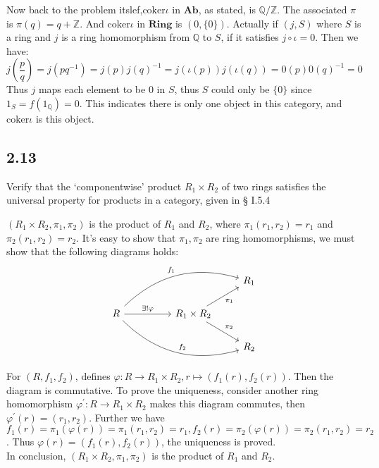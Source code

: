\documentclass[a4paper, pdf, 12pt]{article}
\makeatletter
\renewenvironment{proof}[1][\proofname]{\par
  \pushQED{\qed}%
  \normalfont \topsep6\p@\@plus6\p@\relax
  \trivlist
  \item[%
    \hskip\labelsep
    \normalfont\bfseries %
    #1%
    \@addpunct{.}%
  ]\ignorespaces
}{%
  \popQED\endtrivlist\@endpefalse
}
\let\qed\relax %
\DeclareRobustCommand{\qed}{%
  \ifmmode \mathqed
  \else
    \leavevmode\unskip\penalty\@M\hbox{}\nobreak\hspace{.5em minus .1em}%
    \hbox{\qedsymbol}%
  \fi
}
\makeatother
\begin{document}
\begin{proof}
  Now back to the problem itslef,$\mbox{coker}\iota$ in $\mathbf{Ab}$, as stated, is $\mathbb{Q}/\mathbb{Z}$. The associated $\pi$ is $\pi(q) = q+\mathbb{Z}$. 
  And $\mbox{coker}\iota$ in $\mathbf{Ring}$ is $(0, \{0\})$. Actually if $(j, S)$ where $S$ is a ring  and $j$ is a ring homomorphism from $\mathbb{Q}$ to $S$, 
  if it satisfies $j\circ \iota = 0$. Then we have:
  $$
  j(\frac{p}{q}) = j(pq^{-1}) = j(p)j(q)^{-1}=j(\iota(p))j(\iota(q))=0(p)0(q)^{-1}=0
  $$
  Thus $j$ maps each element to be 0 in $S$, thus $S$ could only be $\{0\}$ since $1_{S}=f(1_{\mathbb{Q}})=0$. This indicates there is only one object in this category,
  and $\mbox{coker}\iota$ is this object.
\end{proof}
\subsection*{2.13}
Verify that the ‘componentwise’ product $R_1\times R_2$ of two rings satisﬁes the universal property for products in a category, given in § I.5.4
\begin{proof}
  $(R_1\times R_2, \pi_1, \pi_2)$ is the product of $R_1$ and $R_2$, where $\pi_1(r_1,r_2)=r_1$ and $\pi_2(r_1, r_2)=r_2$. It's easy to show that $\pi_1, \pi_2$ are 
  ring homomorphisms, we must show that the following diagrams holds:
  $$
\begin{tikzcd}
  &  &                                                        & R_1 \\
R \arrow[rr, "\exists!\varphi"] \arrow[rrru, "f_1", bend left] \arrow[rrrd, "f_2", bend right] &  & R_1\times R_2 \arrow[ru, "\pi_1"'] \arrow[rd, "\pi_2"] &     \\
  &  &                                                        & R_2
\end{tikzcd}
$$
For $(R, f_1, f_2)$, defines $\varphi: R\rightarrow R_1\times R_2, r\mapsto(f_1(r), f_2(r))$. Then the diagram is commutative. To prove the uniqueness, 
consider another ring homomorphism $\varphi^{'}:R\rightarrow R_1\times R_2$ makes this diagram commutes, then $\varphi^{'}(r)=(r_1, r_2)$. Further we have $f_1(r) = \pi_1(\varphi(r)) = \pi_1(r_1, r_2)=r_1, f_2(r)=\pi_2(\varphi(r)) = \pi_2(r_1,r_2) = r_2$. 
Thus $\varphi(r) = (f_1(r), f_2(r))$, the uniqueness is proved.\\

In conclusion, $(R_1\times R_2, \pi_1, \pi_2)$ is the product of $R_1$ and $R_2$.
\end{proof}
\end{document}
